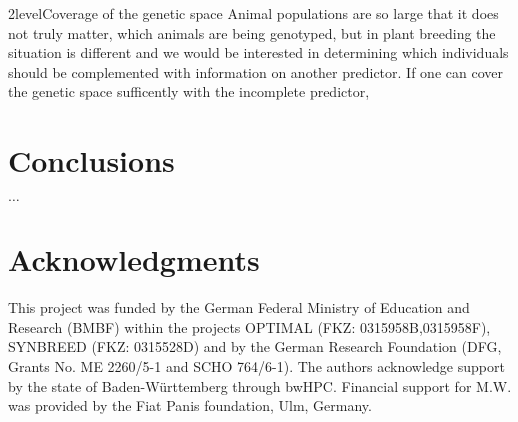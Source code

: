\documentclass[12pt,titlepage]{article}
\begin{document}
\Genetics2level{Coverage of the genetic space}
Animal populations are so large that it does not truly matter, which animals are 
being genotyped, but in plant breeding the situation is different and we would 
be interested in determining which individuals should be complemented with 
information on another predictor.
If one can cover the genetic space sufficently with the incomplete predictor, 





\section*{Conclusions}


$\dots$




\section{Acknowledgments} 
This project was funded by the German Federal Ministry of Education and 
Research (BMBF) within the projects OPTIMAL (FKZ: 0315958B,0315958F),
SYNBREED (FKZ: 0315528D) and by the German Research Foundation 
(DFG, Grants No. ME 2260/5-1 and SCHO 764/6-1).
The authors acknowledge support by the state of Baden-W{\"u}rttemberg through 
bwHPC.
Financial support for M.W. was provided by the Fiat Panis foundation, Ulm,
Germany.



\nolinenumbers


\end{document}
